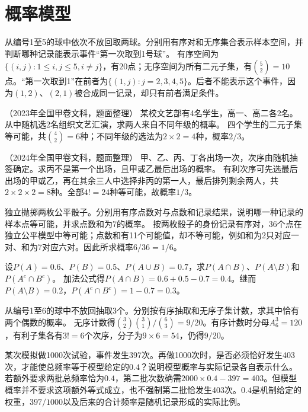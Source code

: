 \par\addvspace{12pt}

\section{概率模型}

从编号1至5的球中依次不放回取两球。分别用有序对和无序集合表示样本空间，并判断哪种记录能表示事件“第一次取到1号球”。
\solutionanswer
有序空间为\(\{(i,j):1\le i,j\le5,i\ne j\}\)，有\(20\)点；无序空间为所有二元子集，有\(\binom52=10\)点。“第一次取到1”在前者为\(\{(1,j):j=2,3,4,5\}\)。后者不能表示这个事件，因为\((1,2)\)、\((2,1)\)被合成同一记录，却只有前者满足条件。


（2023年全国甲卷文科，题面整理）
某校文艺部有4名学生，高一、高二各2名。从中随机选2名组织文艺汇演，求两人来自不同年级的概率。
\solutionanswer
四个学生的二元子集等可能，共\(\binom42=6\)种；不同年级的选法为\(2\times2=4\)种，概率\(2/3\)。


（2024年全国甲卷文科，题面整理）
甲、乙、丙、丁各出场一次，次序由随机抽签确定。求丙不是第一个出场，且甲或乙最后出场的概率。
\solutionanswer
有利次序可先选最后出场的甲或乙，再在其余三人中选择非丙的第一人，最后排列剩余两人，共\(2\times2\times2=8\)种。全部\(4!=24\)种等可能，故概率\(1/3\)。


独立抛掷两枚公平骰子。分别用有序点数对与点数和记录结果，说明哪一种记录的样本点等可能，并求点数和为7的概率。
\solutionanswer
按两枚骰子的身份记录有序对，36个点在独立公平模型中等可能；点数和有11个可能值，却不等可能，例如和为2只对应一对、和为7对应六对。因此所求概率\(6/36=1/6\)。


设\(P(A)=0.6\)、\(P(B)=0.5\)、\(P(A\cup B)=0.7\)，求\(P(A\cap B)\)、\(P(A\setminus B)\)和\(P(A^c\cap B^c)\)。
\solutionanswer
加法公式得\(P(A\cap B)=0.6+0.5-0.7=0.4\)。继而\(P(A\setminus B)=0.2\)，\(P(A^c\cap B^c)=1-0.7=0.3\)。


从编号1至6的球中不放回抽取3个。分别按有序抽取和无序子集计数，求其中恰有两个偶数的概率。
\solutionanswer
无序计数得\(\binom32\binom31/\binom63=9/20\)。有序计数时分母\(A_6^3=120\)，有利子集各有\(3!=6\)个次序，分子为\(9\times6=54\)，仍得\(9/20\)。


某次模拟做1000次试验，事件发生397次。再做1000次时，是否必须恰好发生403次，才能使总频率等于模型给定的\(0.4\)？说明模型概率与实际记录各自表示什么。
\solutionanswer
若额外要求两批总频率恰为\(0.4\)，第二批次数确需\(2000\times0.4-397=403\)。但模型概率并不要求这项额外等式成立，也不强制第二批恰发生403次。\(0.4\)是机制给定的权重，\(397/1000\)以及后来的合计频率是随机记录形成的实际比例。
\par
